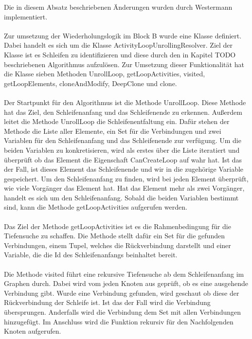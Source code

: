 \documentclass{article}
\begin{document}
    Die in diesem Absatz beschriebenen Änderungen wurden durch Westermann implementiert.\\
    \\
    Zur umsetzung der Wiederholungslogik im Block B wurde eine Klasse definiert.
    Dabei handelt es sich um die Klasse ActivityLoopUnrollingResolver.
    Ziel der Klasse ist es Schleifen zu identifizieren und diese durch den in Kapitel TODO beschriebenen Algorithmus aufzulösen.
    Zur Umsetzung dieser Funktionalität hat die Klasse sieben Methoden UnrollLoop, getLoopActivities, visited, getLoopElements, cloneAndModify, DeepClone und clone.\\
    \\
    Der Startpunkt für den Algorithmus ist die Methode UnrollLoop.
    Diese Methode hat das Ziel, den Schleifenanfang und das Schleifenende zu erkennen. Außerdem leitet die Methode UnrollLoop die Schleifenentfaltung ein.
    Dafür stehen der Methode die Liste aller Elemente, ein Set für die Verbindungen und zwei Variablen für den Schleifenanfang und das Schleifenende zur verfügung.
    Um die beiden Variablen zu konkretisieren, wird als erstes über die Liste iteratiert und überprüft ob das Element die Eigenschaft CanCreateLoop auf wahr hat. Ist das der Fall, ist dieses Element das Schleifenende und wir in die zugehörige Variable gespeichert.
    Um den Schleifenanfang zu finden, wird bei jeden Element überprüft, wie viele Vorgänger das Element hat. 
    Hat das Element mehr als zwei Vorgänger, handelt es sich um den Schleifenanfang.
    Sobald die beiden Variablen bestimmt sind, kann die Methode getLoopActivities aufgerufen werden.\\
    \\
    Das Ziel der Methode getLoopActivities ist es die Rahmenbedingung für die Tiefensuche zu schaffen.
    Die Methode stellt dafür ein Set für die gefunden Verbindungen, einem Tupel, welches die Rückverbindung darstellt und einer Variable, die die Id des Schleifenanfangs beinhaltet bereit.
    \\
    \\
    Die Methode visited führt eine rekursive Tiefensuche ab dem Schleifenanfang im Graphen durch.
    Dabei wird vom jeden Knoten aus geprüft, ob es eine ausgehende Verbindung gibt.
    Wurde eine Verbindung gefunden, wird geschaut ob diese der Rückverbindung der Schleife ist.
    Ist das der Fall wird die Verbindung übersprungen. Anderfalls wird die Verbindung dem Set mit allen Verbindungen hinzugefügt.
    Im Anschluss wird die Funktion rekursiv für den Nachfolgenden Knoten aufgerufen.\\
\end{document}
